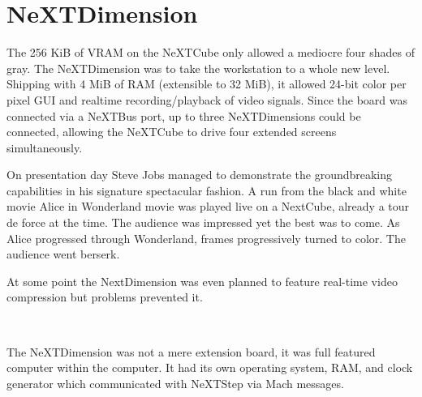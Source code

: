 \section{NeXTDimension}
\vspace{-3pt}
The 256 KiB of VRAM on the NeXTCube only allowed a mediocre four shades of gray. The NeXTDimension was to take the workstation to a whole new level. Shipping with 4 MiB of RAM (extensible to 32 MiB), it allowed 24-bit color per pixel GUI and realtime recording/playback of video signals. Since the board was connected via a NeXTBus port, up to three NeXTDimensions could be connected, allowing the NeXTCube to drive four extended screens simultaneously.\\
\par
On presentation day Steve Jobs managed to demonstrate the groundbreaking capabilities in his signature spectacular fashion. A run from the black and white movie Alice in Wonderland movie was played live on a NextCube, already a tour de force at the time. The audience was impressed yet the best was to come. As Alice progressed through Wonderland, frames progressively turned to color. The audience went berserk.\\
\par
At some point the NextDimension was even planned to feature real-time video compression but problems prevented it.\\
\par
{}\\
\par
The NeXTDimension was not a mere extension board, it was full featured computer within the computer. It had its own operating system, RAM, and clock generator which communicated with NeXTStep via Mach messages.\\
\par
{}
